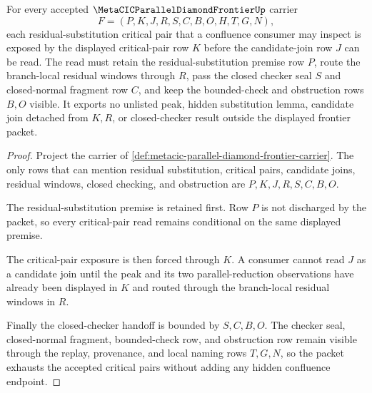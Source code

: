 \begin{theorem}
\label{thm:metacic-parallel-diamond-critical-pair-exhaustion}
For every accepted $\MetaCICParallelDiamondFrontierUp$ carrier
$$
F=(P,K,J,R,S,C,B,O,H,T,G,N),
$$
each residual-substitution critical pair that a confluence consumer may inspect is exposed by the displayed critical-pair row $K$ before the candidate-join row $J$ can be read. The read must retain the residual-substitution premise row $P$, route the branch-local residual windows through $R$, pass the closed checker seal $S$ and closed-normal fragment row $C$, and keep the bounded-check and obstruction rows $B,O$ visible. It exports no unlisted peak, hidden substitution lemma, candidate join detached from $K,R$, or closed-checker result outside the displayed frontier packet.
\end{theorem}
\begin{proof}
Project the carrier of \autoref{def:metacic-parallel-diamond-frontier-carrier}. The only rows that can mention residual substitution, critical pairs, candidate joins, residual windows, closed checking, and obstruction are $P,K,J,R,S,C,B,O$.

The residual-substitution premise is retained first. Row $P$ is not discharged by the packet, so every critical-pair read remains conditional on the same displayed premise.

The critical-pair exposure is then forced through $K$. A consumer cannot read $J$ as a candidate join until the peak and its two parallel-reduction observations have already been displayed in $K$ and routed through the branch-local residual windows in $R$.

Finally the closed-checker handoff is bounded by $S,C,B,O$. The checker seal, closed-normal fragment, bounded-check row, and obstruction row remain visible through the replay, provenance, and local naming rows $T,G,N$, so the packet exhausts the accepted critical pairs without adding any hidden confluence endpoint.
\end{proof}

